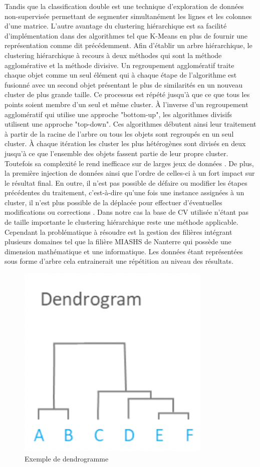\documentclass[memoire.tex]{subfiles}
\begin{document}
 Tandis que la classification double est une technique d'exploration de données non-supervisée permettant de segmenter simultanément les lignes et les colonnes d'une matrice. L'autre avantage du clustering hiérarchique est sa facilité d'implémentation dans des algorithmes tel que K-Means en plus de fournir une représentation comme dit précédemment. Afin d'établir un arbre hiérarchique, le clustering hiérarchique à recours à deux méthodes qui sont la méthode agglomérative et la méthode divisive. Un regroupement agglomératif traite chaque objet comme un seul élément qui à chaque étape de l'algorithme est fusionné avec un second objet présentant le plus de similarités en un nouveau cluster de plus grande taille. Ce processus est répété jusqu'à que ce que tous les points soient membre d'un seul et même cluster. À l'inverse d'un regroupement agglomératif qui utilise une approche "bottom-up", les algorithmes divisifs utilisent une approche "top-down". Ces algorithmes débutent ainsi leur traitement à partir de la racine de l'arbre ou tous les objets sont regroupés en un seul cluster. À chaque itération les cluster les plus hétérogènes sont divisés en deux jusqu'à ce que l'ensemble des objets fassent partie de leur propre cluster. Toutefois sa complexité le rend inefficace sur de larges jeux de données \cite{ref7}. De plus, la première injection de données ainsi que l'ordre de celles-ci  à un fort impact sur le résultat final. En outre, il n'est pas possible de défaire ou modifier les étapes précédentes du traitement, c'est-à-dire qu'une fois une instance assignées à un cluster, il n'est plus possible de la déplacée pour effectuer d'éventuelles modifications ou corrections \cite{ref5}. Dans notre cas la base de CV utilisée n'étant pas de taille importante le clustering hiérarchique reste une méthode applicable. Cependant la problématique à résoudre est la gestion des filières intégrant plusieurs domaines tel que la filière MIASHS de Nanterre qui possède une dimension mathématique et une informatique. Les données étant représentées sous forme d'arbre cela entrainerait une répétition au niveau des résultats.
	\begin{figure}[h!]
		\centerline{\includegraphics[scale=0.8]{img/hierarchical_clustering.png}}
		\caption{Exemple de dendrogramme}
	\end{figure}
	
\end{document}
